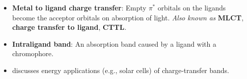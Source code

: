 \documentclass[../notes.tex]{subfiles}
\begin{document}
\begin{itemize}
\begin{itemize}
    \end{itemize}
    \item \textbf{Metal  to ligand charge transfer}: Empty $\pi^*$ orbitals on the ligands become the acceptor orbitals on absorption of light. \emph{Also known as} \textbf{MLCT}, \textbf{charge transfer to ligand}, \textbf{CTTL}.
    \item \textbf{Intraligand band}: An absorption band caused by a ligand with a chromophore.
    \item \textcite{bib:MiesslerFischerTarr} discusses energy applications (e.g., solar cells) of charge-transfer bands.
\end{itemize}
\end{document}

